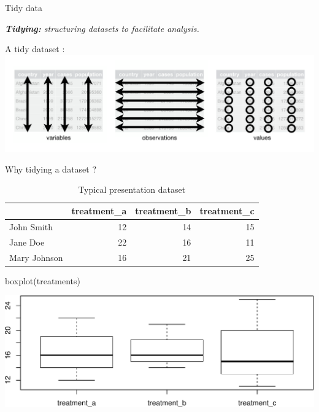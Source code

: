 \documentclass[14pt,ignorenonframetext,]{bredelebeamer}
\newenvironment{Shaded}{\begin{snugshade}}{\end{snugshade}}
\newcommand{\KeywordTok}[1]{\textcolor[rgb]{0.94,0.87,0.69}{#1}}
\newcommand{\NormalTok}[1]{\textcolor[rgb]{0.80,0.80,0.80}{#1}}
\begin{document}
\begin{frame}{Tidy data}

\begin{Large}
\textit{\textbf{Tidying:} structuring datasets to facilitate analysis.}
\end{Large}\begin{center}
A tidy dataset :\\
\includegraphics{images/tidy-1.png}

\end{center}

\end{frame}

\begin{frame}[fragile]{Why tidying a dataset ?}

\begin{center}
\begin{table}[t]

\caption{\label{tab:show1}Typical presentation dataset}
\centering
\begin{tabular}{l|r|r|r}
\hline
  & treatment\_a & treatment\_b & treatment\_c\\
\hline
John Smith & 12 & 14 & 15\\
\hline
Jane Doe & 22 & 16 & 11\\
\hline
Mary Johnson & 16 & 21 & 25\\
\hline
\end{tabular}
\end{table}
\end{center}

\begin{Shaded}
\begin{Highlighting}[]
\KeywordTok{boxplot}\NormalTok{(treatments)}
\end{Highlighting}
\end{Shaded}

\includegraphics{tidyverse_28_03_files/figure-beamer/boxplot1-1.pdf}

\end{frame}
\end{document}

